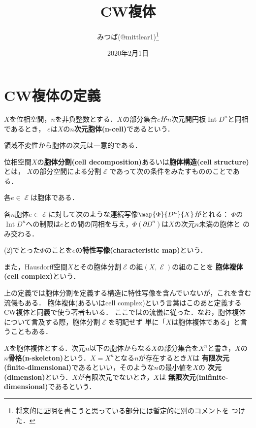 \documentclass[uplatex]{jsarticle}
\title{CW複体}
\author{みつば(@mittlear1)\footnote{将来的に証明を書こうと思っている部分には暫定的に別のコメントを
つけた．}}
\date{2020年2月1日}
\DeclareMathOperator{\Int}{Int}
\begin{document}
\maketitle
\tableofcontents

\section{CW複体の定義}
\begin{definition}
  $X$を位相空間，$n$を非負整数とする．$X$の部分集合$e$が$n$次元開円板$\Int D^n$と同相であるとき，
  $e$は$X$の\textbf{$n$次元胞体(n-cell)}であるという．
\end{definition}

領域不変性から胞体の次元は一意的である．

\begin{definition}
  位相空間$X$の\textbf{胞体分割(cell decomposition)}あるいは\textbf{胞体構造(cell structure)}とは，
  $X$の部分空間による分割$\mscrE$であって次の条件をみたすもののことである．
  \begin{enumarabicp}

    \item 各$e\in \mscrE$は胞体である．
    \item 各$n$胞体$e\in \mscrE$に対して次のような連続写像$\map{\Phi}{D^n}{X}$がとれる：
    $\Phi$の$\Int D^n$への制限は$e$との間の同相を与え，$\Phi(\partial D^n)$は$X$の次元$n$未満の胞体と
    のみ交わる．
  \end{enumarabicp}
  (2)でとった$\Phi$のことを$e$の\textbf{特性写像(characteristic map)}という．

  また，Hausdorff空間$X$とその胞体分割$\mscrE$の組$(X, \mscrE)$の組のことを
  \textbf{胞体複体(cell complex)}という．
\end{definition}

上の定義では胞体分割を定義する構造に特性写像を含んでいないが，これを含む流儀もある．
胞体複体(あるいはcell complex)という言葉はこのあと定義するCW複体と同義で使う著者もいる．
ここでは\cite{LeeSmooth}の流儀に従った．なお，胞体複体について言及する際，胞体分割$\mscrE$を明記せず
単に「$X$は胞体複体である」と言うこともある．

$X$を胞体複体とする．次元$n$以下の胞体からなる$X$の部分集合を$X^n$と書き，$X$の
\textbf{$n$骨格(n-skeleton)}という．$X=X^n$となる$n$が存在するとき$X$は
\textbf{有限次元(finite-dimensional)}であるといい，そのような$n$の最小値を$X$の
\textbf{次元(dimension)}という．$X$が有限次元でないとき，$X$は
\textbf{無限次元(inifinite-dimensional)}であるという．
\end{document}

